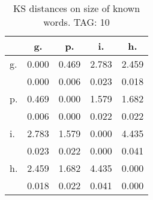 \begin{table}[h!]
\begin{center}
\begin{tabular}{| l | c | c | c | c |}\hline
 & g. & p. & i. & h. \\\hline
g. & 0.000  & 0.469  & 2.783  & 2.459 \\\hline
 & 0.000  & 0.006  & 0.023  & 0.018 \\\hline
p. & 0.469  & 0.000  & 1.579  & 1.682 \\\hline
 & 0.006  & 0.000  & 0.022  & 0.022 \\\hline
i. & 2.783  & 1.579  & 0.000  & 4.435 \\\hline
 & 0.023  & 0.022  & 0.000  & 0.041 \\\hline
h. & 2.459  & 1.682  & 4.435  & 0.000 \\\hline
 & 0.018  & 0.022  & 0.041  & 0.000 \\\hline
\end{tabular}
\caption{KS distances on size of known words. TAG: 10}
\end{center}
\end{table}